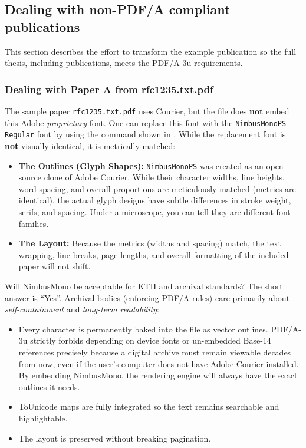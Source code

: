 \documentclass[12pt, twoside]{article}
\newcommand{\fname}[1]{\texttt{#1}}
\begin{document}
\subsection{Dealing with non-PDF/A compliant publications}
\label{sec:nonPDFAcompliantPublications}

This section describes the effort to transform the example publication so the full thesis, including publications, meets the PDF/A-3u requirements.

\subsubsection{Dealing with Paper A from rfc1235.txt.pdf}
\label{sec:dealingWithPaperA}
The sample paper \fname{rfc1235.txt.pdf} uses Courier, but the file does \textbf{not} embed this Adobe \textit{proprietary} font. One can replace this font with the \texttt{NimbusMonoPS-Regular} font by using the command shown in . While the replacement font is \textbf{not} visually identical, it is metrically matched:
\begin{itemize}
    \item \textbf{The Outlines (Glyph Shapes):} \texttt{NimbusMonoPS} was created as an open-source clone of Adobe Courier. While their character widths, line heights, word spacing, and overall proportions are meticulously matched (\ie metrics are identical), the actual glyph designs have subtle differences in stroke weight, serifs, and spacing. Under a microscope, you can tell they are different font families.

    \item \textbf{The Layout:} Because the metrics (widths and spacing) match, the text wrapping, line breaks, page lengths, and overall formatting of the included paper will not shift.
\end{itemize}

Will NimbusMono be acceptable for \gls{KTH} and archival standards? The short answer is \enquote{Yes}. Archival bodies (enforcing PDF/A rules) care primarily about \textit{self-containment} and \textit{long-term readability}:
\begin{itemize}
    \item Every character is permanently baked into the file as vector outlines. PDF/A-3u strictly forbids depending on device fonts or un-embedded Base-14 references precisely because a digital archive must remain viewable decades from now, even if the user's computer does not have Adobe Courier installed. By embedding NimbusMono, the rendering engine will always have the exact outlines it needs.

    \item ToUnicode maps are fully integrated so the text remains searchable and highlightable.

    \item The layout is preserved without breaking pagination.
\end{itemize}
\end{document}
